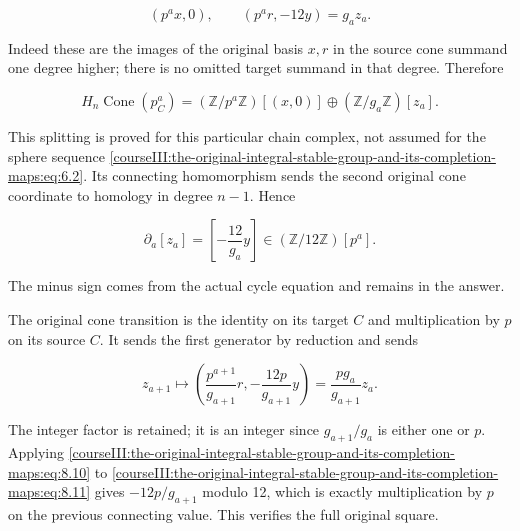 \begin{equation}
(p^ax,0),\qquad(p^ar,-12y)=g_a z_a.
 \label{courseIII:the-original-integral-stable-group-and-its-completion-maps:eq:8.8}
\end{equation}

Indeed these are the images of the original basis \(x,r\) in the source cone summand one degree higher; there is no omitted target summand in that degree. Therefore

\begin{equation}
H_n\operatorname{Cone}(p^a_C)
  = (\mathbb Z/p^a\mathbb Z)[(x,0)]
       \oplus(\mathbb Z/g_a\mathbb Z)[z_a].
 \label{courseIII:the-original-integral-stable-group-and-its-completion-maps:eq:8.9}
\end{equation}

This splitting is proved for this particular chain complex, not assumed for the sphere sequence \eqref{courseIII:the-original-integral-stable-group-and-its-completion-maps:eq:6.2}. Its connecting homomorphism sends the second original cone coordinate to homology in degree \(n-1\). Hence

\begin{equation}
\partial_a[z_a]=\left[-\frac{12}{g_a}y\right]
    \in (\mathbb Z/12\mathbb Z)[p^a].
 \label{courseIII:the-original-integral-stable-group-and-its-completion-maps:eq:8.10}
\end{equation}

The minus sign comes from the actual cycle equation and remains in the answer.

The original cone transition is the identity on its target \(C\) and multiplication by \(p\) on its source \(C\). It sends the first generator by reduction and sends

\begin{equation}
z_{a+1}\longmapsto
 \left(\frac{p^{a+1}}{g_{a+1}}r,-\frac{12p}{g_{a+1}}y\right)
   =\frac{p g_a}{g_{a+1}}z_a.
 \label{courseIII:the-original-integral-stable-group-and-its-completion-maps:eq:8.11}
\end{equation}

The integer factor is retained; it is an integer since \(g_{a+1}/g_a\) is either one or \(p\). Applying \eqref{courseIII:the-original-integral-stable-group-and-its-completion-maps:eq:8.10} to \eqref{courseIII:the-original-integral-stable-group-and-its-completion-maps:eq:8.11} gives
\(-12p/g_{a+1}\) modulo 12, which is exactly multiplication by \(p\) on the previous connecting value. This verifies the full original square.


